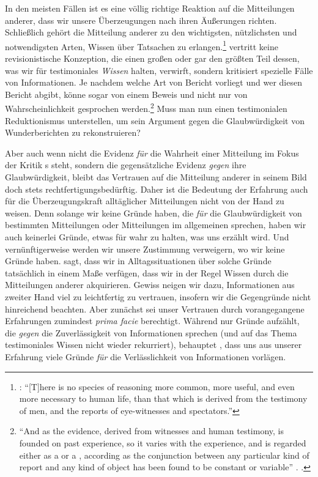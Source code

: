 In den meisten Fällen ist es eine völlig richtige Reaktion auf die Mitteilungen
anderer, dass wir unsere Überzeugungen nach ihren Äußerungen richten.
Schließlich gehört die Mitteilung anderer zu den wichtigsten, nützlichsten und
notwendigsten Arten, Wissen über Tatsachen zu
erlangen.\footnote{\cite[Vgl.][90]{Hume:AnEnquiryConcerningHumanUnderstanding1964}:
\enquote{[T]here is no species of reasoning more common, more useful, and even
more necessary to human life, than that which is derived from the testimony of
men, and the reports of eye-witnesses and spectators.}}  vertritt
keine revisionistische Konzeption, die einen großen oder gar den größten Teil
dessen, was wir für testimoniales \emph{Wissen} halten, verwirft, sondern kritisiert
spezielle Fälle von Informationen. Je nachdem welche Art von Bericht vorliegt
und wer diesen Bericht abgibt, könne sogar von einem Beweis und nicht nur von
Wahrscheinlichkeit gesprochen werden.\footnote{\enquote{And as the evidence,
derived from witnesses and human testimony, is founded on past experience, so it
varies with the experience, and is regarded either as a  or a
, according as the conjunction between any particular kind of
report and any kind of object has been found to be constant or variable}
\parencite[][91]{Hume:AnEnquiryConcerningHumanUnderstanding1964}.
\cite[Vgl.][]{Gelfert:HumeonTestimonyRevisited2010}.} Muss man
 nun einen testimonialen Reduktionismus unterstellen, um sein
Argument gegen die Glaubwürdigkeit von Wunderberichten zu rekonstruieren?


Aber auch wenn nicht die Evidenz \emph{für} die Wahrheit einer Mitteilung im
Fokus der Kritik s steht, sondern die gegensätzliche Evidenz
\emph{gegen} ihre Glaubwürdigkeit, bleibt das Vertrauen auf die Mitteilung
anderer in seinem Bild doch stets rechtfertigungsbedürftig. Daher ist die
Bedeutung der Erfahrung auch für die Überzeugungskraft alltäglicher Mitteilungen
nicht von der Hand zu weisen. Denn solange wir keine Gründe haben, die
\emph{für} die Glaubwürdigkeit von bestimmten Mitteilungen oder Mitteilungen im
allgemeinen sprechen, haben wir auch keinerlei Gründe, etwas für wahr zu halten,
was uns erzählt wird. Und vernünftigerweise werden wir unsere Zustimmung
verweigern, wo wir keine Gründe haben.  sagt, dass wir in
Alltagssituationen über solche Gründe tatsächlich in einem Maße verfügen, dass
wir in der Regel Wissen durch die Mitteilungen anderer akquirieren. Gewiss
neigen wir dazu, Informationen aus zweiter Hand viel zu leichtfertig zu
vertrauen, insofern wir die Gegengründe nicht hinreichend beachten. Aber
zunächst sei unser Vertrauen durch vorangegangene Erfahrungen zumindest
\emph{prima facie} berechtigt. Während  nur Gründe
aufzählt, die \emph{gegen} die Zuverlässigkeit von Informationen sprechen (und
auf das Thema testimoniales Wissen nicht wieder rekurriert), behauptet
, dass uns aus unserer Erfahrung viele Gründe \emph{für} die
Verlässlichkeit von Informationen vorlägen.

